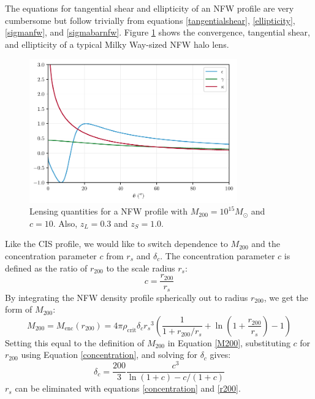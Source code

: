 \documentclass[10pt]{article}
\begin{document}
The equations for tangential shear and ellipticity of an NFW profile are very cumbersome but follow trivially from equations \ref{tangentialshear}, \ref{ellipticity}, \ref{sigmanfw}, and \ref{sigmabarnfw}. Figure \ref{nfwproperties} shows the convergence, tangential shear, and ellipticity of a typical Milky Way-sized NFW halo lens.

\begin{figure}
    \centering
    \includegraphics[width=0.8\textwidth]{nfwproperties.pdf}
    \caption{Lensing quantities for a NFW profile with $M_{200} = 10^{15} M_\odot$ and $c = 10$. Also,  $z_L = 0.3$ and $z_S = 1.0$.}
    \label{nfwproperties}
\end{figure}

Like the CIS profile, we would like to switch dependence to $M_{200}$ and the concentration parameter $c$ from $r_s$ and $\delta_c$. The concentration parameter $c$ is defined as the ratio of $r_{200}$ to the scale radius $r_s$:
\begin{equation} \label{concentration}
c = \frac{r_{200}}{r_s}
\end{equation}
By integrating the NFW density profile spherically out to radius $r_{200}$, we get the form of $M_{200}$:
\begin{equation} \label{nfwM200}
M_{200} = M_\mathrm{enc}(r_{200}) = 4 \pi \rho_\mathrm{crit} \delta_c {r_s}^3 \left( \frac{1}{1 + r_{200}/r_s} + \ln{\left(1 + \frac{r_{200}}{r_s} \right)} - 1 \right)
\end{equation}
Setting this equal to the definition of $M_{200}$ in Equation \ref{M200}, substituting $c$ for $r_{200}$ using Equation \ref{concentration}, and solving for $\delta_c$ gives:
\begin{equation}
\delta_c = \frac{200}{3} \frac{c^3}{\ln(1 + c) - c/(1 + c)}
\end{equation}
$r_s$ can be eliminated with equations \ref{concentration} and \ref{r200}.
\end{document}
